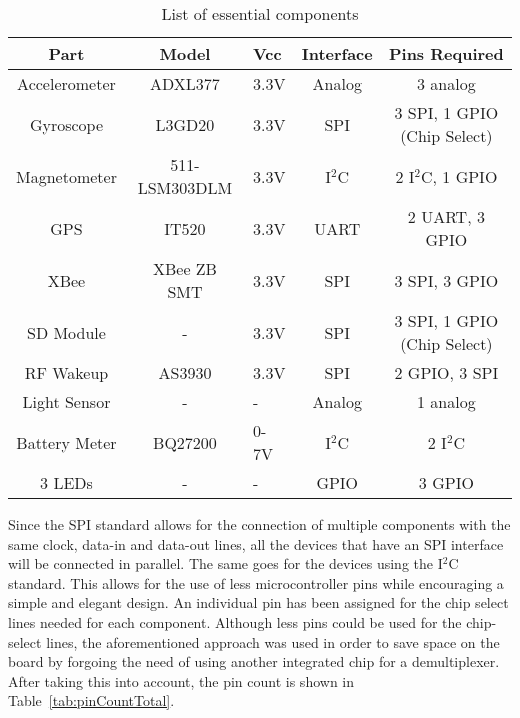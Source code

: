 \begin{table}[H]
\setlength{\extrarowheight}{1.5pt}
  \centering
  \caption{List of essential components}
    \begin{tabular}{|c|c|m{0.35in}|c|c|}
    \hline
    Part  & Model & \centering Vcc & Interface & Pins Required \\
    \hline \hline
    Accelerometer & ADXL377 & \centering 3.3V  & Analog & 3 analog \\ \hline
    Gyroscope & L3GD20 & \centering 3.3V  & SPI   & 3 SPI, 1 GPIO (Chip Select) \\ \hline
    Magnetometer & 511-LSM303DLM & \centering 3.3V  & I$^2$C   & 2 I$^2$C, 1 GPIO \\ \hline
    GPS   & IT520 & \centering 3.3V   & UART  & 2 UART, 3 GPIO \\ \hline 
    XBee  & XBee ZB SMT &\centering 3.3V  & SPI   & 3 SPI, 3 GPIO \\ \hline
    SD Module &   \centering -    & \centering 3.3V  & SPI   & 3 SPI, 1 GPIO (Chip Select) \\ \hline
    RF Wakeup & AS3930 & \centering 3.3V  & SPI   & 2 GPIO, 3 SPI \\ \hline
    Light Sensor & \centering - & \centering - & Analog & 1 analog \\ \hline
    Battery Meter & BQ27200 & 0-7V & \centering I$^2$C & 2 I$^2$C \\ \hline
    3 LEDs & \centering - & \centering - & GPIO & 3 GPIO \\ \hline
    
    \end{tabular}%
  \label{tab:componentPinCount}%
\end{table}%

Since the SPI standard allows for the connection of multiple components with the same clock, data-in and data-out lines, all the devices that have an SPI interface will be connected in parallel.  The same goes for the devices using the I$^2$C standard.  This allows for the use of less microcontroller pins while encouraging a simple and elegant design.  An individual pin has been assigned for the chip select lines needed for each component.  Although less pins could be used for the chip-select lines, the aforementioned approach was used in order to save space on the board by forgoing the need of using another integrated chip for a demultiplexer.  After taking this into account, the pin count is shown in Table~\ref{tab:pinCountTotal}.

